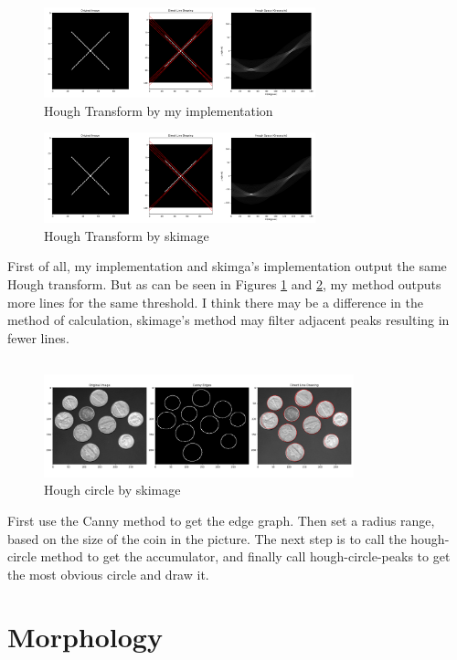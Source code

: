 \documentclass[12pt]{article}
\begin{document}
\subsection{}
\begin{figure}[ht]
    \centering
    \includegraphics[width=0.7\textwidth]{pics/A7_3.2_1.png} 
    \caption{Hough Transform by my implementation}
    \label{fig: Figure 1}
\end{figure}
\begin{figure}[ht]
    \centering
    \includegraphics[width=0.7\textwidth]{pics/A7_3.2_2.png} 
    \caption{Hough Transform by skimage}
    \label{fig: Figure 2}
\end{figure}
First of all, my implementation and skimga's implementation output the same Hough transform.
But as can be seen in Figures \ref{fig: Figure 1} and \ref{fig: Figure 2}, my method outputs more lines for the same threshold.
I think there may be a difference in the method of calculation, skimage's method may filter adjacent peaks resulting in fewer lines.
\subsection{}
\begin{figure}[ht]
    \centering
    \includegraphics[width=0.8\textwidth]{pics/A7_3.3.png} 
    \caption{Hough circle by skimage}
    \label{fig: Figure 3}
\end{figure}
First use the Canny method to get the edge graph.
Then set a radius range, based on the size of the coin in the picture. 
The next step is to call the hough-circle method to get the accumulator, and finally call hough-circle-peaks to get the most obvious circle and draw it.
\subsection{}
\section{Morphology}
\end{document}
